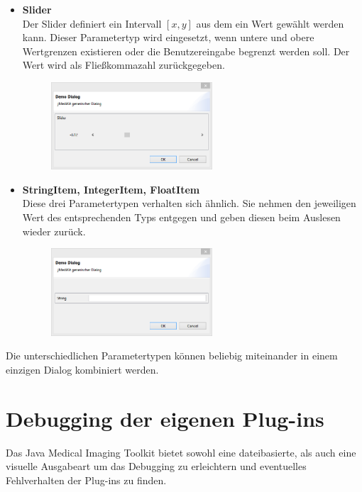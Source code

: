 \begin{itemize}
\item \textbf{Slider}\\
Der Slider definiert ein Intervall $[x,y]$ aus dem ein Wert gewählt werden kann. Dieser Parametertyp wird eingesetzt, wenn untere und obere Wertgrenzen existieren oder die Benutzereingabe begrenzt werden soll. Der Wert wird als Fließkommazahl zurückgegeben.
\begin{figure}[H]
\includegraphics[angle=0,width=6cm]{./img/slider.png}
\end{figure}

\item \textbf{StringItem, IntegerItem, FloatItem}\\
Diese drei Parametertypen verhalten sich ähnlich. Sie nehmen den jeweiligen Wert des entsprechenden Typs entgegen und geben diesen beim Auslesen wieder zurück.
\begin{figure}[H]
\includegraphics[angle=0,width=6cm]{./img/stringitem.png}
\end{figure}

\end{itemize}

Die unterschiedlichen Parametertypen können beliebig miteinander in einem einzigen Dialog kombiniert werden.

\section{Debugging der eigenen Plug-ins}

Das Java Medical Imaging Toolkit bietet sowohl eine dateibasierte, als auch eine visuelle Ausgabeart um das Debugging zu erleichtern und eventuelles Fehlverhalten der Plug-ins zu finden.

